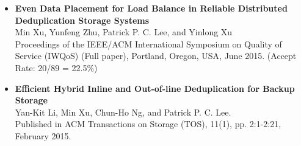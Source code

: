 \begin{itemize}
\item \textbf{Even Data Placement for Load Balance in Reliable Distributed Deduplication Storage Systems} \\
Min Xu, Yunfeng Zhu, Patrick P. C. Lee, and Yinlong Xu\\
Proceedings of the IEEE/ACM International Symposium on Quality of Service (IWQoS) (Full paper), Portland, Oregon, USA, June 2015.
(Accept Rate: 20/89 = 22.5\%)
\item \textbf{Efficient Hybrid Inline and Out-of-line Deduplication for Backup Storage}\\
Yan-Kit Li, Min Xu, Chun-Ho Ng, and Patrick P. C. Lee.\\
Published in ACM Transactions on Storage (TOS), 11(1), pp. 2:1-2:21, February 2015.
\end{itemize}

